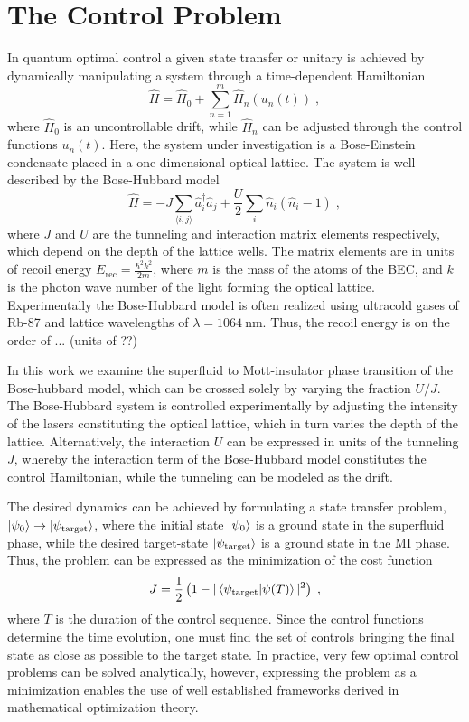 \section{The Control Problem}

In quantum optimal control a given state transfer or unitary is achieved by dynamically manipulating a system through a time-dependent Hamiltonian
\begin{equation}
	\hat{H} =  \hat{H}_0 + \sum_{n = 1}^{m}  \hat{H}_n (u_n(t)) \; ,
	\label{eq:ControlHamiltonians}
\end{equation} 
where $\hat{H}_0$ is an uncontrollable drift, while $\hat{H}_n$ can be adjusted through the control functions $u_n(t)$. Here, the system under investigation is a Bose-Einstein condensate placed in a one-dimensional optical lattice. The system is well described by the Bose-Hubbard model
\begin{equation}
	\hat{H} = - J \sum_{\langle i,j \rangle} \hat{a}_{i}^{\dag} \hat{a}_{j} + \frac{U}{2} \sum_{i} \hat{n}_i \left( \hat{n}_i -1 \right) \; ,
\end{equation}
where $J$ and $U$ are the tunneling and interaction matrix elements respectively, which depend on the depth of the lattice wells. The matrix elements are in units of recoil energy $E_{\mathrm{rec}} = \frac{\hbar ^2 k^2}{2 m}$, where $m$ is the mass of the atoms of the BEC, and $k$ is the photon wave number of the light forming the optical lattice.
Experimentally the Bose-Hubbard model is often realized using ultracold gases of Rb-87 and lattice wavelengths of $\lambda = 1064 \: \mathrm{nm}$. Thus, the recoil energy is on the order of ... (units of ??)

In this work we examine the superfluid to Mott-insulator phase transition of the Bose-hubbard model, which can be crossed solely by varying the fraction $U/J$. The Bose-Hubbard system is controlled experimentally by adjusting the intensity of the lasers constituting the optical lattice, which in turn varies the depth of the lattice. Alternatively, the interaction $U$ can be expressed in units of the tunneling $J$, whereby the interaction term of the Bose-Hubbard model constitutes the control Hamiltonian, while the tunneling can be modeled as the drift.

The desired dynamics can be achieved by formulating a state transfer problem, $\ket{\psi_0} \to \ket{\psi_{\mathrm{target}}}$, where the initial state $\ket{\psi_0}$ is a ground state in the superfluid phase, while the desired target-state $\ket{\psi_{\mathrm{target}}}$ is a ground state in the MI phase. Thus, the problem can be expressed as the minimization of the cost function
\begin{equation}
	J = \frac{1}{2} \left( 1-|\braket{\psi_{\mathrm{target}} | \psi (T)}|^2 \right) \; ,
	\label{eq:infidelityCost}
\end{equation}
where $T$ is the duration of the control sequence. Since the control functions determine the time evolution, one must find the set of controls bringing the final state as close as possible to the target state. In practice, very few optimal control problems can be solved analytically, however, expressing the problem as a minimization enables the use of well established frameworks derived in mathematical optimization theory.